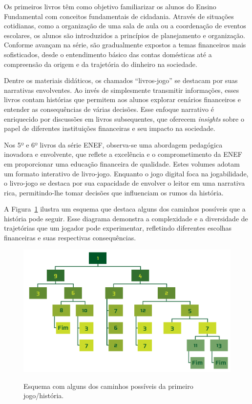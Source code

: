 Os primeiros livros têm como objetivo familiarizar os alunos do Ensino Fundamental com conceitos fundamentais de cidadania. Através de situações cotidianas, como a organização de uma sala de aula ou a coordenação de eventos escolares, os alunos são introduzidos a princípios de planejamento e organização. Conforme avançam na série, são gradualmente expostos a temas financeiros mais sofisticados, desde o entendimento básico das contas domésticas até a compreensão da origem e da trajetória do dinheiro na sociedade.

Dentre os materiais didáticos, os chamados ``livros-jogo'' se destacam por suas narrativas envolventes. Ao invés de simplesmente transmitir informações, esses livros contam histórias que permitem aos alunos explorar cenários financeiros e entender as consequências de várias decisões. Esse enfoque narrativo é enriquecido por discussões em livros subsequentes, que oferecem \textit{insights} sobre o papel de diferentes instituições financeiras e seu impacto na sociedade.

Nos 5º e 6º livros da série ENEF, observa-se uma abordagem pedagógica inovadora e envolvente, que reflete a excelência e o comprometimento da ENEF em proporcionar uma educação financeira de qualidade. Estes volumes adotam um formato interativo de livro-jogo. Enquanto o jogo digital foca na jogabilidade, o livro-jogo se destaca por sua capacidade de envolver o leitor em uma narrativa rica, permitindo-lhe tomar decisões que influenciam os rumos da história.


A Figura~\ref{fig:figure-1} ilustra um esquema que destaca alguns dos caminhos possíveis que a história pode seguir. Esse diagrama demonstra a complexidade e a diversidade de trajetórias que um jogador pode experimentar, refletindo diferentes escolhas financeiras e suas respectivas consequências.

\begin{figure}[ht]
	\centering
	\caption{Esquema com alguns dos caminhos possíveis da primeiro jogo/história.}
	\includegraphics[scale=0.3]{Textuais/Pictures/Picture1.png}
	\label{fig:figure-1}
\end{figure}

